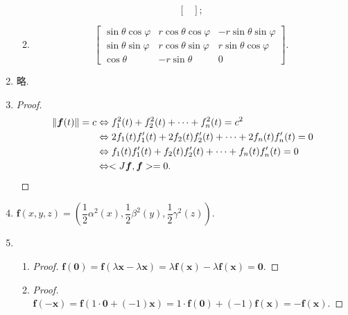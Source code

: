 \begin{enumerate}
\begin{enumerate}[(1)]
\[\begin{bmatrix}
                    \end{bmatrix};    
                \]
            \item %
                \[
                    \begin{bmatrix}
                        \sin\theta\cos\varphi & r\cos\theta\cos\varphi & -r\sin\theta\sin\varphi \\
                        \sin\theta\sin\varphi & r\cos\theta\sin\varphi & r\sin\theta\cos\varphi \\
                        \cos\theta & -r\sin\theta & 0
                    \end{bmatrix}.    
                \]
        \end{enumerate}
    \item %
        略.
    \item %
        \begin{proof}
            \begin{align*}
                \|\boldsymbol{f}(t)\| = c
                &\Leftrightarrow
                f_1^2(t) + f_2^2(t) + \cdots + f_n^2(t) = c^2 \\
                &\Leftrightarrow
                2f_1(t)f_1'(t) + 2f_2(t)f_2'(t) + \cdots + 2f_n(t)f_n'(t) = 0 \\
                &\Leftrightarrow
                f_1(t)f_1'(t) + f_2(t)f_2'(t) + \cdots + f_n(t)f_n'(t) = 0 \\
                &\Leftrightarrow
                <J\boldsymbol{f}, \boldsymbol{f}> = 0. \qedhere
            \end{align*}
        \end{proof}
    \item %
        $\boldsymbol{f}(x, y, z) = \left(\dfrac12\alpha^2(x), \dfrac12\beta^2(y), \dfrac12\gamma^2(z)\right)$.
    \item %
        \begin{enumerate}[(1)]
            \item %
                \begin{proof}
                    $\boldsymbol{f}(\boldsymbol{0}) = \boldsymbol{f}(\lambda\boldsymbol{x} - \lambda\boldsymbol{x}) = \lambda\boldsymbol{f}(\boldsymbol{x}) - \lambda\boldsymbol{f}(\boldsymbol{x}) = \boldsymbol{0}$.
                \end{proof}
            \item %
                \begin{proof}
                    $\boldsymbol{f}(-\boldsymbol{x}) = \boldsymbol{f}(1 \cdot \boldsymbol{0} + (-1)\boldsymbol{x}) = 1\cdot\boldsymbol{f}(\boldsymbol{0}) + (-1)\boldsymbol{f}(\boldsymbol{x}) = -\boldsymbol{f}(\boldsymbol{x})$.

\end{proof}
\end{enumerate}
\end{enumerate}
